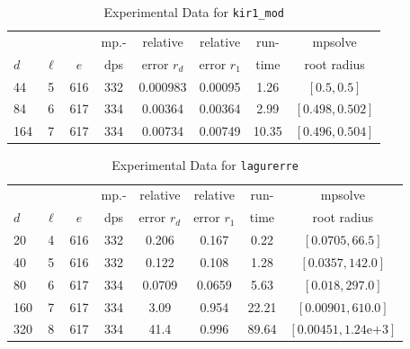 \documentclass[runningheads]{llncs}
\begin{document}
\begin{table}
\caption{Experimental Data for \texttt{kir1\_mod}} %
\label{tab:kir1_mod}
\vskip -0.15in
\begin{center}
\begin{small}
\begin{sc}
\begin{tabular}{lccccccc}
\toprule
&  &  & mp.-& relative  & relative & run- & mpsolve \\
$d$& $\ell$& $e$ & dps&error $r_d$       & error $r_1$ &time& root radius\\
\midrule
 44 & 5 & 616 & 332 & 0.000983 & 0.00095 & 1.26 & $[0.5, 0.5]$\\
 84 & 6 & 617 & 334 & 0.00364 & 0.00364 & 2.99 & $[0.498, 0.502]$\\
 164 & 7 & 617 & 334 & 0.00734 & 0.00749 & 10.35 & $[0.496, 0.504]$\\ %
\bottomrule
\end{tabular}
\end{sc}
\end{small}
\end{center}
\vskip 0.05in
\end{table}


\begin{table}
\caption{Experimental Data for \texttt{lagurerre}} %
\label{tab:lagurerre}
\vskip -0.15in
\begin{center}
\begin{small}
\begin{sc}
\begin{tabular}{lccccccc}
\toprule
&  &  & mp.-& relative  & relative & run- & mpsolve \\
$d$& $\ell$& $e$ & dps&error $r_d$       & error $r_1$ &time& root radius\\
\midrule
 20 & 4 & 616 & 332 & 0.206 & 0.167 & 0.22 & $[0.0705, 66.5]$\\
 40 & 5 & 616 & 332 & 0.122 & 0.108 & 1.28 & $[0.0357, 142.0]$\\
 80 & 6 & 617 & 334 & 0.0709 & 0.0659 & 5.63 & $[0.018, 297.0]$\\
 160 & 7 & 617 & 334 & 3.09 & 0.954 & 22.21 & $[0.00901, 610.0]$\\
 320 & 8 & 617 & 334 & 41.4 & 0.996 & 89.64 & $[0.00451, 1.24\text{e+}3]$\\
\bottomrule
\end{tabular}
\end{sc}
\end{small}
\end{center}
\vskip 0.05in
\end{table}
\end{document}
